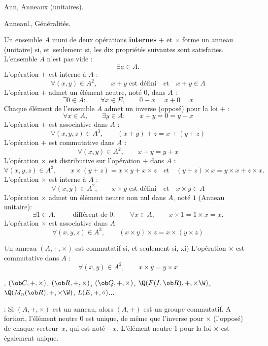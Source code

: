                              
\Section Ann, Anneaux (unitaires).

\Subsection Anneau1, Généralités. 

\Definition Un ensemble $A$ muni de deux opérations {\bf internes} $+$ et $\times$ forme un anneau (unitaire) si, et~seulement si, 
les dix propriétés suivantes sont satisfaites.
\pn
{} L'ensemble $A$ n'est pas vide : 
$$
\exists a\in A.
$$ 
 L'opération $+$ est interne à $A$ : 
$$
\forall (x,y)\in A^2, \qquad x+y\mbox{ est défini}\quad\mbox{et}\quad x+y\in A
$$
 L'opération $+$ admet un élément neutre, noté $0$, dans $A$ : 
$$
\exists 0\in A:\qquad \forall x\in E,\qquad 0+x=x+0=x
$$
 Chaque élément de l'ensemble $A$ admet un inverse (opposé) pour la loi $+$ : 
$$
\forall x\in A, \qquad \exists y\in A:\qquad x+y=0=y+x
$$
 L'opération $+$ est associative dans $A$ :
$$
\forall (x,y,z)\in A^3, \qquad(x+y)+z=x+(y+z)
$$ 
 L'opération $+$ est commutative dans $A$ : 
$$
\forall (x,y)\in A^2, \qquad x+y=y+x
$$
 L'opération $\times$ est distributive sur l'opération $+$ dans $A$ : 
$$
\forall(x,y,z)\in A^3, \qquad x\times(y+z)=x\times y+x\times z\quad\mbox{et}\quad (y+z)\times x=y\times x+z\times x.
$$ 
 L'opération $\times$ est interne à $A$ : 
$$
\forall (x,y)\in A^2,\qquad x\times y\mbox{ est défini}\quad \mbox{et}\quad x\times y\in A
$$
 L'opération $\times$ admet un élément neutre non nul dans $A$, noté $1$ (Anneau unitaire):
$$
\exists 1\in A, \qquad\mbox{ différent de }0: \qquad \forall x\in A, \qquad x\times1=1\times x=x.
$$ 
 L'opération $\times$ est associative dans $A$
$$
\forall (x,y,z)\in A^3, \qquad(x\times y)\times z=x\times(y\times z)
$$ 

\bigskip

\noindent
\Definition []  Un anneau $(A,+,\times)$ est commutatif si, et seulement si, 
\bigskip
\noindent xi) L'opération $\times$ est commutative dans $A$ : 
$$
\forall (x,y)\in A^2, \qquad x\times y=y\times x
$$
\bigskip

                             
\Exemples.  $(\ob C,+,\times)$, $(\ob R,+,\times)$, $(\ob Q, +,\times)$, $\Q(\sc F(I,\ob R),+,\times\W)$, $\Q(\sc M_n(\ob R),+,\times\W)$, $\sc L(E,+,\circ )$... 
\bigskip

\Remarque : Si $(A,+,\times)$ est un anneau, alors $(A,+)$ est un groupe commutatif. A fortiori, l'élément neutre $0$ est unique, de même que 
l'inverse pour $\times$ (l'opposé) de chaque vecteur~$x$, qui est noté $-x$. L'élément neutre $1$ pour la loi $\times$ est également unique. 
\bigskip

